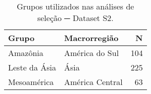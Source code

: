 \begin{table}[htbp!]
\centering

\setlength\extrarowheight{1pt}

\centering
\begin{tabular}[htb!]{p{3cm}p{3.5cm}r}
\toprule
Grupo & Macrorregião & N\\
\midrule
Amazônia & América do Sul & 104\\
Leste da Ásia & Ásia & 225\\
Mesoamérica & América Central & 63\\ [0.1ex] 
\bottomrule
\end{tabular}

\caption{Grupos utilizados nas análises de seleção ─ Dataset S2.}
\label{tab:ds2_selgroups}

\end{table}
